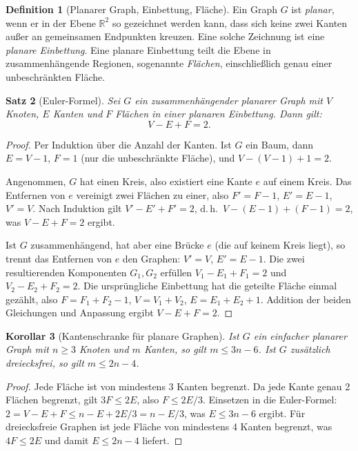 \documentclass[12pt,a4paper]{amsart}
\newtheorem{theorem}{Satz}[section]
\newtheorem{corollary}[theorem]{Korollar}
\theoremstyle{definition}
\newtheorem{definition}[theorem]{Definition}
\theoremstyle{remark}
\newcommand{\R}{\mathbb{R}}
\begin{document}
\begin{definition}[Planarer Graph, Einbettung, Fläche]
Ein Graph $G$ ist \emph{planar}, wenn er in der Ebene $\R^2$ so gezeichnet
werden kann, dass sich keine zwei Kanten außer an gemeinsamen Endpunkten
kreuzen. Eine solche Zeichnung ist eine \emph{planare Einbettung}. Eine
planare Einbettung teilt die Ebene in zusammenhängende Regionen, sogenannte
\emph{Flächen}, einschließlich genau einer unbeschränkten Fläche.
\end{definition}

\begin{theorem}[Euler-Formel]
\label{satz:eulerformel}
Sei $G$ ein zusammenhängender planarer Graph mit $V$ Knoten, $E$ Kanten und
$F$ Flächen in einer planaren Einbettung. Dann gilt:
\[
  V - E + F = 2.
\]
\end{theorem}

\begin{proof}
Per Induktion über die Anzahl der Kanten. Ist $G$ ein Baum, dann $E = V - 1$,
$F = 1$ (nur die unbeschränkte Fläche), und $V - (V-1) + 1 = 2$. \checkmark

Angenommen, $G$ hat einen Kreis, also existiert eine Kante $e$ auf einem
Kreis. Das Entfernen von $e$ vereinigt zwei Flächen zu einer, also
$F' = F - 1$, $E' = E - 1$, $V' = V$. Nach Induktion gilt $V' - E' + F' = 2$,
d.\,h.\ $V - (E-1) + (F-1) = 2$, was $V - E + F = 2$ ergibt. \checkmark

Ist $G$ zusammenhängend, hat aber eine Brücke $e$ (die auf keinem Kreis liegt),
so trennt das Entfernen von $e$ den Graphen: $V' = V$, $E' = E - 1$. Die zwei
resultierenden Komponenten $G_1, G_2$ erfüllen $V_1 - E_1 + F_1 = 2$ und
$V_2 - E_2 + F_2 = 2$. Die ursprüngliche Einbettung hat die geteilte Fläche
einmal gezählt, also $F = F_1 + F_2 - 1$, $V = V_1 + V_2$, $E = E_1 + E_2 + 1$.
Addition der beiden Gleichungen und Anpassung ergibt $V - E + F = 2$.
\end{proof}

\begin{corollary}[Kantenschranke für planare Graphen]
\label{kor:planare-kanten}
Ist $G$ ein einfacher planarer Graph mit $n \ge 3$ Knoten und $m$ Kanten, so
gilt $m \le 3n - 6$. Ist $G$ zusätzlich dreiecksfrei, so gilt $m \le 2n - 4$.
\end{corollary}

\begin{proof}
Jede Fläche ist von mindestens 3 Kanten begrenzt. Da jede Kante genau
2 Flächen begrenzt, gilt $3F \le 2E$, also $F \le 2E/3$. Einsetzen in
die Euler-Formel: $2 = V - E + F \le n - E + 2E/3 = n - E/3$, was
$E \le 3n - 6$ ergibt. Für dreiecksfreie Graphen ist jede Fläche von
mindestens 4 Kanten begrenzt, was $4F \le 2E$ und damit $E \le 2n - 4$ liefert.
\end{proof}
\end{document}
